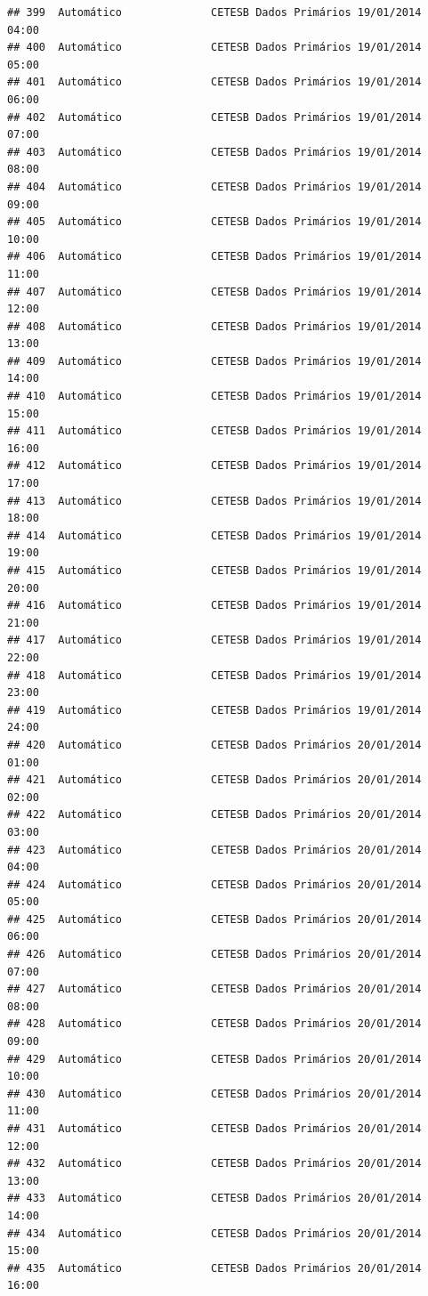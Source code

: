 \documentclass[]{book}
\begin{document}
\begin{verbatim}
## 399  Automático              CETESB Dados Primários 19/01/2014 04:00
## 400  Automático              CETESB Dados Primários 19/01/2014 05:00
## 401  Automático              CETESB Dados Primários 19/01/2014 06:00
## 402  Automático              CETESB Dados Primários 19/01/2014 07:00
## 403  Automático              CETESB Dados Primários 19/01/2014 08:00
## 404  Automático              CETESB Dados Primários 19/01/2014 09:00
## 405  Automático              CETESB Dados Primários 19/01/2014 10:00
## 406  Automático              CETESB Dados Primários 19/01/2014 11:00
## 407  Automático              CETESB Dados Primários 19/01/2014 12:00
## 408  Automático              CETESB Dados Primários 19/01/2014 13:00
## 409  Automático              CETESB Dados Primários 19/01/2014 14:00
## 410  Automático              CETESB Dados Primários 19/01/2014 15:00
## 411  Automático              CETESB Dados Primários 19/01/2014 16:00
## 412  Automático              CETESB Dados Primários 19/01/2014 17:00
## 413  Automático              CETESB Dados Primários 19/01/2014 18:00
## 414  Automático              CETESB Dados Primários 19/01/2014 19:00
## 415  Automático              CETESB Dados Primários 19/01/2014 20:00
## 416  Automático              CETESB Dados Primários 19/01/2014 21:00
## 417  Automático              CETESB Dados Primários 19/01/2014 22:00
## 418  Automático              CETESB Dados Primários 19/01/2014 23:00
## 419  Automático              CETESB Dados Primários 19/01/2014 24:00
## 420  Automático              CETESB Dados Primários 20/01/2014 01:00
## 421  Automático              CETESB Dados Primários 20/01/2014 02:00
## 422  Automático              CETESB Dados Primários 20/01/2014 03:00
## 423  Automático              CETESB Dados Primários 20/01/2014 04:00
## 424  Automático              CETESB Dados Primários 20/01/2014 05:00
## 425  Automático              CETESB Dados Primários 20/01/2014 06:00
## 426  Automático              CETESB Dados Primários 20/01/2014 07:00
## 427  Automático              CETESB Dados Primários 20/01/2014 08:00
## 428  Automático              CETESB Dados Primários 20/01/2014 09:00
## 429  Automático              CETESB Dados Primários 20/01/2014 10:00
## 430  Automático              CETESB Dados Primários 20/01/2014 11:00
## 431  Automático              CETESB Dados Primários 20/01/2014 12:00
## 432  Automático              CETESB Dados Primários 20/01/2014 13:00
## 433  Automático              CETESB Dados Primários 20/01/2014 14:00
## 434  Automático              CETESB Dados Primários 20/01/2014 15:00
## 435  Automático              CETESB Dados Primários 20/01/2014 16:00

\end{verbatim}
\end{document}
